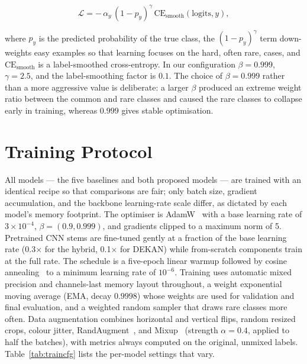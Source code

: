 \begin{equation}
\mathcal{L} = -\,\alpha_y\,(1 - p_y)^{\gamma}\,\mathrm{CE}_{\text{smooth}}(\text{logits}, y),
\end{equation}

where $p_y$ is the predicted probability of the true class, the
$(1-p_y)^{\gamma}$ term down-weights easy examples so that learning focuses on
the hard, often rare, cases, and $\mathrm{CE}_{\text{smooth}}$ is a
label-smoothed cross-entropy. In our configuration $\beta = 0.999$,
$\gamma = 2.5$, and the label-smoothing factor is $0.1$. The choice of
$\beta = 0.999$ rather than a more aggressive value is deliberate: a larger
$\beta$ produced an extreme weight ratio between the common and rare classes and
caused the rare classes to collapse early in training, whereas $0.999$ gives
stable optimisation.

\section{Training Protocol}

All models --- the five baselines and both proposed models --- are trained with
an identical recipe so that comparisons are fair; only batch size, gradient
accumulation, and the backbone learning-rate scale differ, as dictated by each
model's memory footprint. The optimiser is AdamW~\cite{loshchilov2019adamw} with
a base learning rate of $3\times10^{-4}$, $\beta=(0.9, 0.999)$, and gradients
clipped to a maximum norm of 5. Pretrained CNN stems are fine-tuned gently at a
fraction of the base learning rate (0.3$\times$ for the hybrid, 0.1$\times$ for
DEKAN) while from-scratch components train at the full rate. The schedule is a
five-epoch linear warmup followed by cosine annealing~\cite{loshchilov2017sgdr}
to a minimum learning rate of $10^{-6}$. Training uses automatic mixed precision
and channels-last memory layout throughout, a weight exponential moving average
(EMA, decay $0.9998$) whose weights are used for validation and final
evaluation, and a weighted random sampler that draws rare classes more often.
Data augmentation combines horizontal and vertical flips, random resized crops,
colour jitter, RandAugment~\cite{cubuk2020randaugment}, and
Mixup~\cite{zhang2018mixup} (strength $\alpha=0.4$, applied to half the batches),
with metrics always computed on the original, unmixed labels. Table~\ref{tab:traincfg}
lists the per-model settings that vary.

